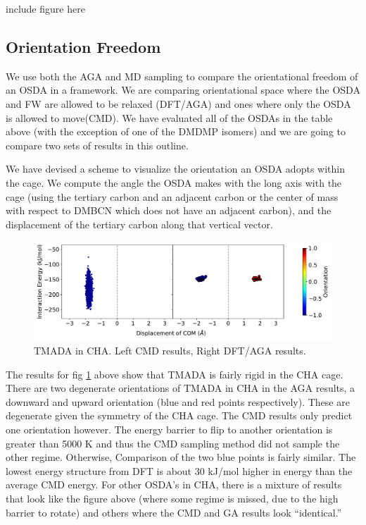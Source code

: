 \documentclass[journal=accacs,manuscript=article, email=true, layout=traditional]{achemso}
\begin{document}
include figure here

\subsection{Orientation Freedom}
\label{sec:orga3d731a}
We use both the AGA and MD sampling to compare the orientational freedom of an OSDA in a framework. We are comparing orientational space where the OSDA and FW are allowed to be relaxed (DFT/AGA) and ones where only the OSDA is allowed to move(CMD). We have evaluated all of the OSDAs in the table above (with the exception of one of the DMDMP isomers) and we are going to compare two sets of results in this outline. 

We have devised a scheme to visualize the orientation an OSDA adopts within the cage. We compute the angle the OSDA makes with the long axis with the cage (using the tertiary carbon and an adjacent carbon or the center of mass with respect to DMBCN which does not have an adjacent carbon), and the displacement of the tertiary carbon along that vertical vector. 

\begin{figure}
\begin{center}

\includegraphics[scale=.5]{./Figures/CHA-GA-CMD-TMADA.pdf}
\caption{TMADA in CHA. Left CMD results, Right DFT/AGA results.} 
\label{fig:TMADA-CHA} 

\end{center}
\end{figure}

The results for fig \ref{fig:TMADA-CHA} above show that TMADA is fairly rigid in the CHA cage. There are two degenerate orientations of TMADA in CHA in the AGA results, a downward and upward orientation (blue and red points respectively). These are degenerate given the symmetry of the CHA cage. The CMD results only predict one orientation however. The energy barrier to flip to another orientation is greater than 5000 K and thus the CMD sampling method did not sample the other regime. Otherwise, Comparison of the two blue points is fairly similar. The lowest energy structure from DFT is about 30 kJ/mol higher in energy than the average CMD energy. For other OSDA's in CHA, there is a mixture of results that look like the figure above (where some regime is missed, due to the high barrier to rotate) and others where the CMD and GA results look ``identical.''
\end{document}
